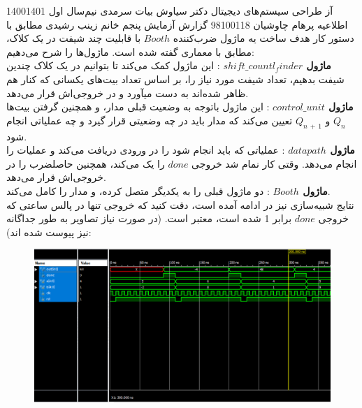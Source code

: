 \documentclass[a4paper,12pt]{article}
\begin{document}
\handout
{آز طراحی سیستم‌های دیجیتال}
{دکتر سیاوش بیات سرمدی}
{نیم‌سال اول 1400\lr{-}1401}
{اطلاعیه}
{پرهام چاوشیان}
{98100118}
 {گزارش آزمایش پنجم}
{خانم زینب رشیدی}
مطابق با دستور کار هدف ساخت یه ماژول ضرب‌کننده $Booth$ با قابلیت چند شیفت در یک کلاک، مطابق با معماری گفته شده است. ماژول‌ها را شرح می‌دهیم:\\
\textbf{ماژول $shift\_countl_finder$} :
این ماژول کمک می‌کند تا بتوانیم در یک کلاک چندین شیفت بدهیم، تعداد شیفت مورد نیاز را، بر اساس تعداد بیت‌های یکسانی که کنار هم ظاهر شده‌اند به دست میآورد و در خروجی‌اش قرار می‌دهد.\\
\textbf{ماژول $control\_unit$} :
این ماژول باتوجه به وضعیت قبلی مدار، و همچنین گرفتن بیت‌ها
$Q_n$
و
$Q_{n\,+\,1}$
تعیین می‌کند که مدار باید در چه وضعیتی قرار گیرد و چه عملیاتی انجام شود.\\
\textbf{ماژول $datapath$} :
عملیاتی که باید انجام شود را در ورودی دریافت می‌کند و عملیات را انجام می‌دهد. وقتی کار نمام شد خروجی $done$ را یک می‌کند، همچنین حاصلضرب را در خروجی‌اش قرار می‌دهد.\\
\textbf{ماژول $Booth$} :
دو ماژول قبلی را به یکدیگر متصل کرده، و مدار را کامل می‌کند.\\
نتایج شبیه‌سازی نیز در ادامه آمده است، دقت کنید که خروجی تنها در پالس ساعتی که خروجی $done$ برابر 1 شده است، معتبر است. (در صورت نیاز تصاویر به طور جداگانه نیز پیوست شده اند):
\begin{figure}[H]
 \centering
  \includegraphics[width=0.8\linewidth]{s1}
\end{figure}
\end{document}
